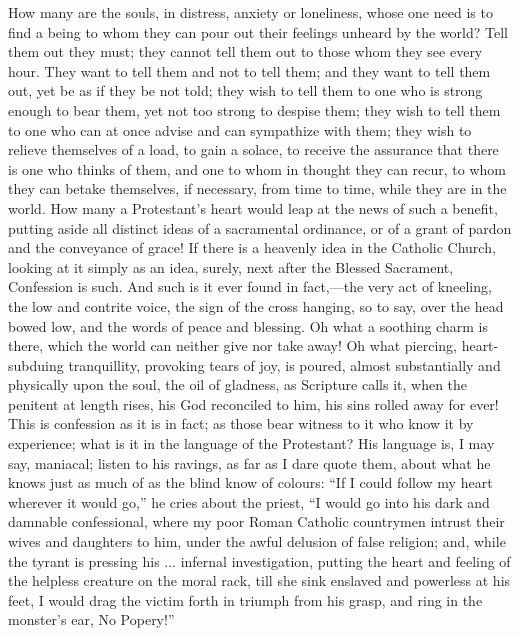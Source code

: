 How many are the souls, in distress, anxiety or
loneliness, whose one need is to find a being to whom
they can pour out their feelings unheard by the world?
Tell them out they must; they cannot tell them out to
those whom they see every hour. They want to tell them
and not to tell them; and they want to tell them out, yet
be as if they be not told; they wish to tell them to one
who is strong enough to bear them, yet not too strong to
despise them; they wish to tell them to one who can at
once advise and can sympathize with them; they wish to
relieve themselves of a load, to gain a solace, to
receive the assurance that there is one who thinks of
them, and one to whom in thought they can recur, to whom
they can betake themselves, if necessary, from time to
time, while they are in the world. How many a
Protestant's heart would leap at the news of such a
benefit, putting aside all distinct ideas of a
sacramental ordinance, or of a grant of pardon and the
conveyance of grace! If there is a heavenly idea in the
Catholic Church, looking at it simply as an idea, surely,
next after the Blessed Sacrament, Confession is such. And
such is it ever found in fact,—the very act of kneeling,
the low and contrite voice, the sign of the cross
hanging, so to say, over the head bowed low, and the
words of peace and blessing. Oh what a soothing charm is
there, which the world can neither give nor take away! Oh
what piercing, heart-subduing tranquillity, provoking tears of joy, is poured, almost substantially and
physically upon the soul, the oil of gladness, as
Scripture calls it, when the penitent at length rises,
his God reconciled to him, his sins rolled away for ever!
This is confession as it is in fact; as those bear
witness to it who know it by experience; what is it in
the language of the Protestant? His language is, I may
say, maniacal; listen to his ravings, as far as I dare
quote them, about what he knows just as much of as the
blind know of colours: ``If I could follow my heart
wherever it would go,'' he cries about the priest,
``I would go into his dark and damnable confessional,
where my poor Roman Catholic countrymen intrust their
wives and daughters to him, under the awful delusion of
false religion; and, while the tyrant is pressing his ...
infernal investigation, putting the heart and feeling of
the helpless creature on the moral rack, till she sink
enslaved and powerless at his feet, I would drag the
victim forth in triumph from his grasp, and ring in the
monster's ear, No Popery!''

